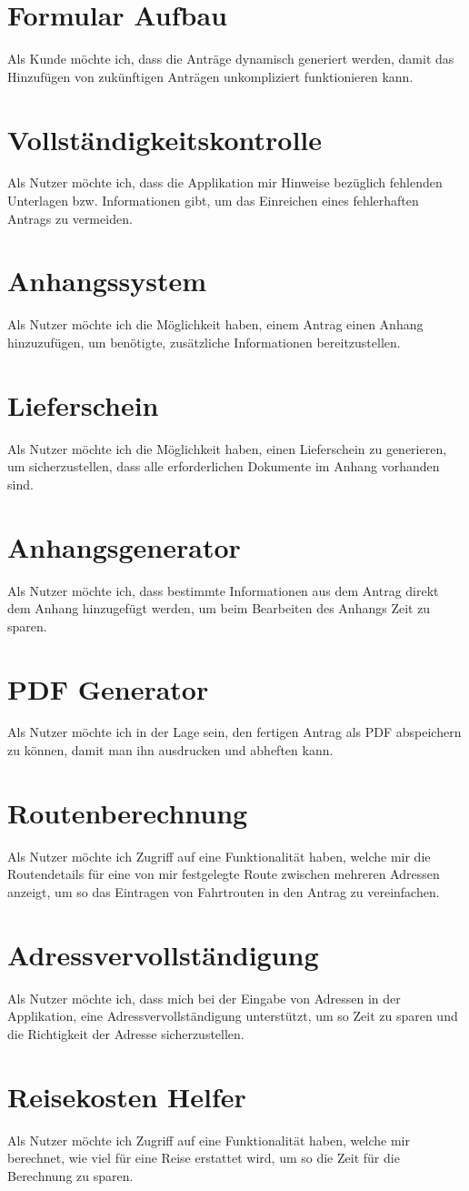 \section{Formular Aufbau}
Als Kunde möchte ich, dass die Anträge dynamisch generiert werden, damit das Hinzufügen von zukünftigen
Anträgen unkompliziert funktionieren kann.
\section{Vollständigkeitskontrolle}
Als Nutzer möchte ich, dass die Applikation mir Hinweise bezüglich fehlenden Unterlagen bzw. 
Informationen gibt, um das Einreichen eines fehlerhaften Antrags zu vermeiden.
\section{Anhangssystem}
Als Nutzer möchte ich die Möglichkeit haben, einem Antrag einen Anhang hinzuzufügen, um benötigte, 
zusätzliche Informationen bereitzustellen.
\section{Lieferschein}
Als Nutzer möchte ich die Möglichkeit haben, einen Lieferschein zu generieren, um sicherzustellen, 
dass alle erforderlichen Dokumente im Anhang vorhanden sind.
\section{Anhangsgenerator}
Als Nutzer möchte ich, dass bestimmte Informationen aus dem Antrag direkt dem Anhang hinzugefügt 
werden, um beim Bearbeiten des Anhangs Zeit zu sparen.
\section{PDF Generator}
Als Nutzer möchte ich in der Lage sein, den fertigen Antrag als PDF abspeichern zu können, damit man 
ihn ausdrucken und abheften kann.
\section{Routenberechnung}
Als Nutzer möchte ich Zugriff auf eine Funktionalität haben, welche mir die Routendetails für eine von mir festgelegte
Route zwischen mehreren Adressen anzeigt, um so das Eintragen von Fahrtrouten in den Antrag zu vereinfachen.
\section{Adressvervollständigung}
Als Nutzer möchte ich, dass mich bei der Eingabe von Adressen in der Applikation, eine 
Adressvervollständigung unterstützt, um so Zeit zu sparen und die Richtigkeit der 
Adresse sicherzustellen.
\section{Reisekosten Helfer}
Als Nutzer möchte ich Zugriff auf eine Funktionalität haben, welche mir berechnet, wie viel für eine 
Reise erstattet wird, um so die Zeit für die Berechnung zu sparen.